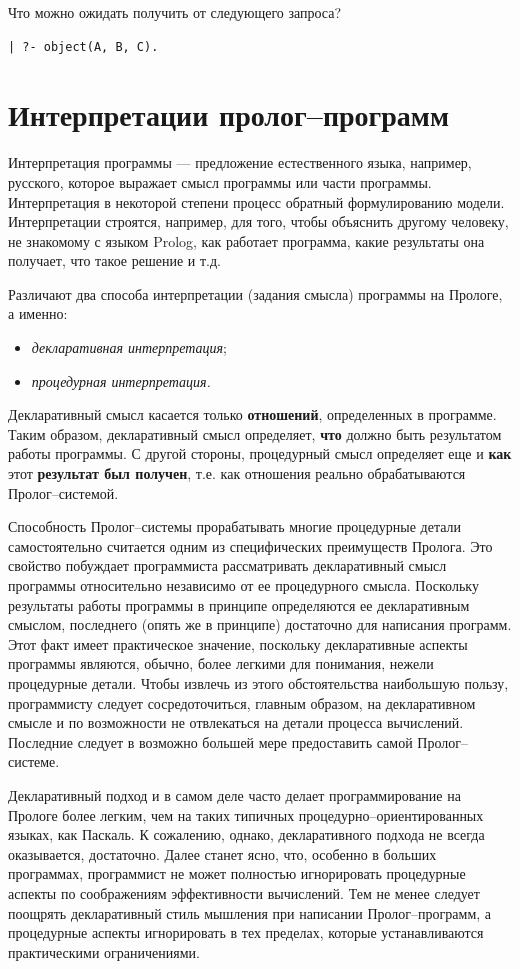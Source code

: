 \documentclass[12pt, openany, twoside]{book} %
\begin{document}
Что можно ожидать получить от следующего запроса?
{\tt\begin{verbatim}
| ?- object(А, В, С).
\end{verbatim}}

\section{Интерпретации пролог--программ}

Интерпретация программы --- предложение естественного языка, например, русского, которое выражает смысл программы или части программы. Интерпретация в некоторой степени процесс обратный формулированию модели. Интерпретации строятся, например, для того, чтобы объяснить другому человеку, не знакомому с языком Prolog, как работает программа, какие результаты она получает, что такое решение и т.д.

Различают два способа \cite{Bratko} интерпретации (задания смысла) программы на Прологе, а именно:
\begin{itemize}
\item \emph{декларативная интерпретация};
\item \emph{процедурная интерпретация.}
\end{itemize}


Декларативный смысл касается только \textbf{отношений}, определенных в программе. Таким образом, декларативный смысл определяет, {\bf что} должно быть результатом работы программы. С другой стороны, процедурный смысл определяет еще и {\bf как} этот {\bf результат был получен}, т.е. как отношения реально обрабатываются Пролог--системой.

Способность Пролог--системы прорабатывать многие процедурные детали самостоятельно считается одним из специфических преимуществ Пролога. Это свойство побуждает программиста рассматривать декларативный смысл программы относительно независимо от ее процедурного смысла. Поскольку результаты работы программы в принципе определяются ее декларативным смыслом, последнего (опять же в принципе) достаточно для написания программ. Этот факт имеет практическое значение, поскольку декларативные аспекты программы являются, обычно, более легкими для понимания, нежели процедурные детали. Чтобы извлечь из этого обстоятельства наибольшую пользу, программисту следует сосредоточиться, главным образом, на декларативном смысле и по возможности не отвлекаться на детали процесса вычислений. Последние следует в возможно большей мере предоставить самой Пролог--системе.

Декларативный подход и в самом деле часто делает программирование на Прологе более легким, чем на таких типичных процедурно--ориентированных языках, как Паскаль. К сожалению, однако, декларативного подхода не всегда оказывается, достаточно. Далее станет ясно, что, особенно в больших программах, программист не может полностью игнорировать процедурные аспекты по соображениям эффективности вычислений. Тем не менее следует поощрять декларативный стиль мышления при написании Пролог--программ, а процедурные аспекты игнорировать в тех пределах, которые устанавливаются практическими ограничениями.
\end{document}
